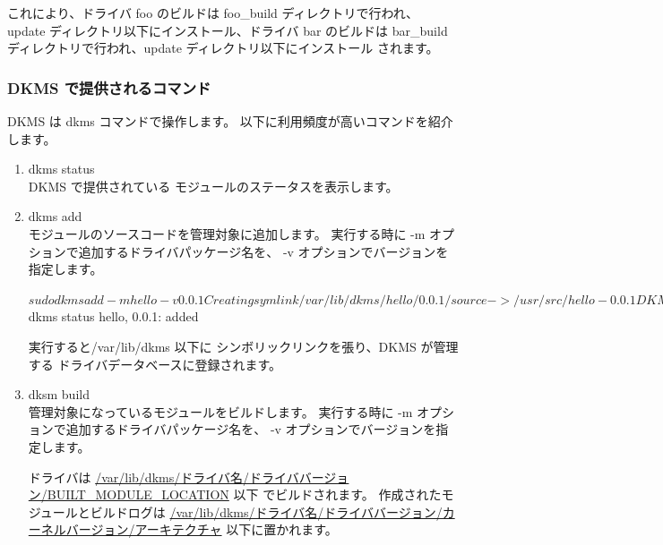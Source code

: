 \documentclass[mingoth,a4paper]{jsarticle}
\begin{document}
これにより、ドライバ foo のビルドは foo\_build ディレクトリで行われ、
update ディレクトリ以下にインストール、ドライバ bar のビルドは
bar\_build ディレクトリで行われ、update ディレクトリ以下にインストール
されます。

\subsubsection{DKMS で提供されるコマンド}
DKMS は dkms コマンドで操作します。
以下に利用頻度が高いコマンドを紹介します。

\begin{enumerate}
\item dkms status\\
DKMS で提供されている モジュールのステータスを表示します。

\item dkms add \\
モジュールのソースコードを管理対象に追加します。
実行する時に -m オプションで追加するドライバパッケージ名を、
-v オプションでバージョンを指定します。

\begin{commandline}
$ sudo dkms add -m hello -v 0.0.1

Creating symlink /var/lib/dkms/hello/0.0.1/source ->
                 /usr/src/hello-0.0.1

DKMS: add completed.
$ dkms status
hello, 0.0.1: added
\end{commandline}

実行すると/var/lib/dkms 以下に シンボリックリンクを張り、DKMS が管理する
ドライバデータベースに登録されます。

\item dksm build \\
管理対象になっているモジュールをビルドします。
実行する時に -m オプションで追加するドライバパッケージ名を、
-v オプションでバージョンを指定します。

ドライバは \url{/var/lib/dkms/ドライバ名/ドライババージョン/BUILT\_MODULE\_LOCATION} 以下
でビルドされます。                   
作成されたモジュールとビルドログは
\url{/var/lib/dkms/ドライバ名/ドライババージョン/カーネルバージョン/アーキテクチャ}
以下に置かれます。


\end{enumerate}
\end{document}
